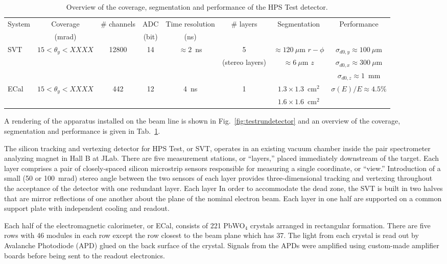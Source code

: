 \documentclass[final,3p,times,twocolumn]{elsarticle}
\begin{document}
\begin{center}
\begin{table}[t]
{\small
\caption{Overview of the coverage, segmentation and performance of the HPS Test detector. }
\begin{tabular}{lccccccc}
\hline 
System & Coverage & \# channels & ADC & Time resolution & \# layers & Segmentation & Performance \\
 & (mrad) &  & (bit) & (ns) &  &  &  \\
\hline
SVT & $15<\theta_{y} < XXXX$ & 12800 & 14 & $\approx 2$~ns & 5  & $\approx 120~\mu$m $r-\phi$ & $\sigma_{d0,y}  \approx 100~\mu$m \\
& &  &  &  & (stereo layers) & $\approx 6~\mu$m $z$ & $\sigma_{d0,x} \approx 300~\mu$m \\
& &  &  &  &  &  & $\sigma_{d0,z}\approx 1$~mm \\
\hline
ECal & $15<\theta_{y} < XXXX$ & 442 & 12 & 4~ns & 1 & $1.3\times1.3$~cm$^2$  & $\sigma(E)/E \approx 4.5\%$ \\ 
 &  &  &  &  &  & $1.6\times1.6$~cm$^2$  &  \\ 
\hline
\end{tabular}
\label{tab:detector-overview}
}
\end{table}
\end{center}
A rendering of the apparatus installed on the beam line is shown in 
Fig.~\ref{fig:testrundetector} and an overview of the coverage, segmentation and performance is 
given in Tab.~\ref{tab:detector-overview}.  

The silicon tracking and vertexing detector for HPS Test, or SVT, operates in an existing vacuum 
chamber inside the pair spectrometer analyzing magnet in Hall B at JLab.  There are five 
measurement stations, or ``layers,'' placed immediately downstream of the target. Each layer 
comprises a pair of closely-spaced silicon microstrip sensors responsible for measuring a single 
coordinate, or ``view.'' Introduction of a small (50 or 100~mrad) stereo angle between the two 
sensors of each layer provides three-dimensional tracking and vertexing throughout the acceptance 
of the detector with one redundant layer. Each layer In order to accommodate the dead zone, the 
SVT is built in two halves that are mirror reflections of one another about the plane of the nominal 
electron beam.  Each layer in one half are supported on a common support plate with independent 
cooling and readout. 

Each half of the electromagnetic calorimeter, or ECal, consists of 221 PbWO$_4$ crystals arranged 
in rectangular formation. There are five rows with 46 modules in each row except the row closest to 
the beam plane which has 37. The light from each crystal 
is read out by Avalanche Photodiode (APD) glued on the back surface of the crystal. 
Signals from the APDs were amplified using custom-made amplifier boards before being sent to the 
readout electronics.  
\end{document}
